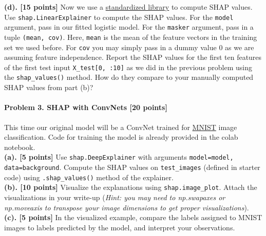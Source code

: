 \textbf{(d). [15 points]} Now we use a \href{https://shap.readthedocs.io/en/latest/}{standardized library} to compute SHAP values. Use \verb|shap.LinearExplainer| to compute the SHAP values. For the \verb|model| argument, pass in our fitted logistic model. For the \verb|masker| argument, pass in a tuple \verb|(mean, cov)|. Here, \verb|mean| is the mean of the feature vectors in the training set we used before. For \verb|cov| you may simply pass in a dummy value $0$ as we are assuming feature independence. Report the SHAP values for the first ten features of the first test input \verb|X_test[0, :10]| as we did in the previous problem using the \verb|shap_values()| method. How do they compare to your manually computed SHAP values from part (b)? 


\paragraph{Problem 3. SHAP with ConvNets [20 points]} This time our original model will be a ConvNet trained for \href{https://en.wikipedia.org/wiki/MNIST_database}{MNIST} image classification. Code for training the model is already provided in the colab notebook. \\

\textbf{(a). [5 points]} 
Use \verb|shap.DeepExplainer| with arguments \verb|model=model, data=background|. Compute the SHAP values on \verb|test_images| (defined in starter code) using \verb|.shap_values()| method of the explainer.\\

\textbf{(b). [10 points]} 
Visualize the explanations using \verb|shap.image_plot|. Attach the visualizations in your write-up (\emph{Hint: you may need to np.swapaxes or np.moveaxis to transpose your image dimensions to get proper visualizations}). \\

\textbf{(c). [5 points]} In the visualized example, compare the labels assigned to MNIST images to labels predicted by the model, and interpret your observations.
